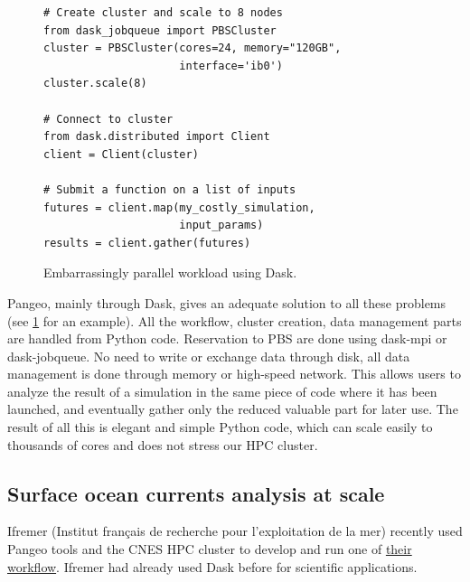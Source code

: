 \documentclass{article}
\begin{document}
\begin{figure}
\begin{verbatim}
# Create cluster and scale to 8 nodes
from dask_jobqueue import PBSCluster
cluster = PBSCluster(cores=24, memory="120GB", 
                     interface='ib0')
cluster.scale(8)

# Connect to cluster
from dask.distributed import Client
client = Client(cluster)

# Submit a function on a list of inputs
futures = client.map(my_costly_simulation, 
                     input_params)
results = client.gather(futures)
\end{verbatim}
\caption{\label{ep_dask_code} Embarrassingly parallel workload using Dask.}
\end{figure}

Pangeo, mainly through Dask, gives an adequate solution to all these problems (see \ref{ep_dask_code} for an example). All the workflow, cluster creation, data management parts are handled from Python code. Reservation to PBS are done using dask-mpi or dask-jobqueue. No need to write or exchange data through disk, all data management is done through memory or high-speed network. This allows users to analyze the result of a simulation in the same piece of code where it has been launched, and eventually gather only the reduced valuable part for later use. The result of all this is elegant and simple Python code, which can scale easily to thousands of cores and does not stress our HPC cluster.

\subsection{Surface ocean currents analysis at scale}
\label{ssec:usecase3}

Ifremer (Institut français de recherche pour l'exploitation de la mer) recently used 
Pangeo tools and the CNES HPC cluster to develop and run one of 
\href{https://github.com/apatlpo/mit_equinox/blob/master/hal/rechunk_rotspectra.ipynb}{their workflow}. Ifremer had already used Dask before for scientific applications\cite{b9}.
\end{document}
